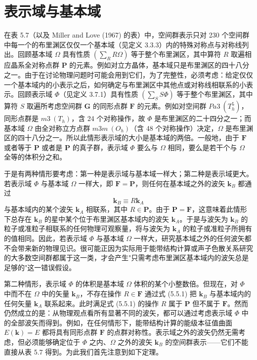 \section{表示域与基本域}

在表 5.7（以及 Miller and Love (1967) 的表）中，空间群表示只对 230 个空间群中每一个的布里渊区仅仅一个基本域（见定义 3.3.3）内的特殊对称点与对称线列出。回顾基本域 $\Omega$ 具有性质 $(\sum_{R}R\Omega)$ 等于整个布里渊区，其中算符 $R$ 取遍相应晶系全对称点群 $\mathbf{P}$ 的元素。例如对立方晶体，基本域只是布里渊区的四十八分之一。由于在讨论物理问题时可能会用到它们，为了完整性，必须考虑：给定仅仅一个基本域内的小表示之后，如何确定与布里渊区中其他点或对称线相联系的小表示。回顾表示域 $\Phi$（见定义 3.7.1）具有性质 $(\sum_{S}S\Phi)$ 等于整个布里渊区，其中算符 $S$ 取遍所考虑空间群 $\mathbf{G}$ 的同形点群 $\mathbf{F}$ 的元素。例如对空间群 $Pa3\ (T^{5}_{h})$，同形点群是 $m3\ (T_{h})$，含 24 个对称操作，故 $\Phi$ 是布里渊区的二十四分之一；而基本域 $\Omega$ 由全对称立方点群 $m3m\ (O_{h})$（含 48 个对称操作）决定，$\Omega$ 是布里渊区的四十八分之一。所以此情形表示域的大小是基本域的两倍。一般地，由于 $\mathbf{F}$ 或者等于 $\mathbf{P}$ 或者是 $\mathbf{P}$ 的真子群，表示域 $\Phi$ 要么与 $\Omega$ 相同，要么是若干个与 $\Omega$ 全等的体积分之和。

于是有两种情形要考虑：第一种是表示域与基本域一样大；第二种是表示域更大。若表示域 $\Phi$ 与基本域 $\Omega$ 一样大，即 $\mathbf{F} = \mathbf{P}$，则任何在基本域之外的波矢 $\mathbf{k}_{B}$ 都通过
\begin{equation*}
\mathbf{k}_{B} \equiv R\mathbf{k}_{A}
\tag{5.5.1}
\end{equation*}
与基本域内的某个波矢 $\mathbf{k}_{A}$ 相联系，其中 $R \in \mathbf{P}$。由于 $\mathbf{P} = \mathbf{F}$，这意味着此情形下总存在 $\mathbf{k}_{B}$ 的星中某个位于布里渊区基本域内的波矢 $\mathbf{k}_{A}$。于是与波矢为 $\mathbf{k}_{B}$ 的粒子或准粒子相联系的任何物理可观察量，将与波矢为 $\mathbf{k}_{A}$ 的粒子或准粒子所拥有的值相同。因此，若表示域 $\Phi$ 与基本域 $\Omega$ 一样大，研究基本域之外的任何波矢都不会带来新的物理见识。很可能正因为实际用于能带结构计算或声子色散关系研究的大多数空间群都属于这一类，才会产生"只需考虑布里渊区基本域内的波矢总是足够的"这一错误假设。

第二种情形，表示域 $\Phi$ 的体积是基本域 $\Omega$ 体积的某个小整数倍。但现在，对 $\Phi$ 中而不在 $\Omega$ 中的矢量 $\mathbf{k}_{B}$，不存在操作 $R \in \mathbf{F}$ 通过式 (5.5.1) 把 $\mathbf{k}_{B}$ 与基本域内的任何矢量 $\mathbf{k}_{A}$ 联系起来。此时满足式 (5.5.1) 的操作 $R$ 属于 $\mathbf{P}$ 但不属于 $\mathbf{F}$。然而仍然成立的是：从物理观点看所有显著不同的波矢，都可以通过考虑表示域 $\Phi$ 中的全部波矢而得到。例如，在任何情形下，能带结构计算的能级本征值曲面 $E(\mathbf{k}) = E$ 都将具有同形点群 $\mathbf{F}$ 的点群对称性。表示域之外的波矢仍然无需考虑，但必须能够确定位于 $\Phi$ 之内、$\Omega$ 之外的波矢 $\mathbf{k}_{B}$ 的空间群表示——它们不能直接从表 5.7 得到。为此我们首先注意到如下定理。

